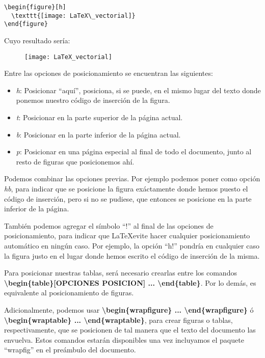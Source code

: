 \begin{lstlisting}[language={[LaTeX]Tex}]
\begin{figure}[h]
  \texttt{[image: LaTeX\_vectorial]}	
\end{figure}
\end{lstlisting}

Cuyo resultado sería:

\begin{figure}[h]
	\texttt{[image: LaTeX\_vectorial]}	
\end{figure}

Entre las opciones de posicionamiento se encuentran las siguientes:

\begin{itemize}
	\item \emph{h}: Posicionar ``aquí'', posiciona, si se puede, en el mismo lugar del texto donde ponemos nuestro código de inserción de la figura.
	\item \emph{t}: Posicionar en la parte superior de la página actual.
	\item \emph{b}: Posicionar en la parte inferior de la página actual.
	\item \emph{p}: Posicionar en una página especial al final de todo el documento, junto al resto de figuras que posicionemos ahí.
\end{itemize}

Podemos combinar las opciones previas. Por ejemplo podemos poner como opción \emph{hb}, para indicar que se posicione la figura exáctamente donde hemos puesto el código de inserción, pero si no se pudiese, que entonces se posicione en la parte inferior de la página.

También podemos agregar el símbolo ``!'' al final de las opciones de posicionamiento, para indicar que \LaTeX evite hacer cualquier posicionamiento automático en ningún caso. Por ejemplo, la opción ``h!'' pondría en cualquier caso la figura justo en el lugar donde hemos escrito el código de inserción de la misma.

Para posicionar nuestras tablas, será necesario crearlas entre los comandos \textbf{\textbackslash begin\{table\}[OPCIONES POSICION] ... \textbackslash end\{table\}}. Por lo demás, es equivalente al posicionamiento de figuras.

Adicionalmente, podemos usar \textbf{\textbackslash begin\{wrapfigure\} ... \textbackslash end\{wrapfigure\}} ó \textbf{\textbackslash begin\{wraptable\} ... \textbackslash end\{wraptable\}}, para crear figuras o tablas, respectivamente, que se posicionen de tal manera que el texto del documento las envuelva. Estos comandos estarán disponibles una vez incluyamos el paquete ``wrapfig'' en el preámbulo del documento.

